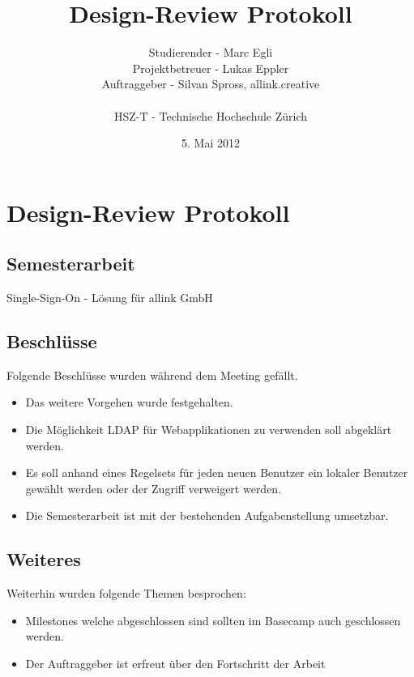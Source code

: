 \documentclass[]{scrreprt}
\title{Design-Review Protokoll}
\author{Studierender - Marc Egli\\
    Projektbetreuer - Lukas Eppler\\
    Auftraggeber - Silvan Spross, allink.creative\\
    \\
    HSZ-T - Technische Hochschule Zürich}
\date{5. Mai 2012}
\begin{document}
    \ifpdf
    \else
    \fi

    \maketitle



    \chapter{Design-Review Protokoll}

    \section{Semesterarbeit}
    Single-Sign-On - Lösung für allink GmbH

    \section{Beschlüsse}
    \label{sec:Beschlüsse}
    Folgende Beschlüsse wurden während dem Meeting gefällt.
    \begin{itemize}
        \item Das weitere Vorgehen wurde festgehalten.
        \item Die Möglichkeit LDAP für Webapplikationen zu verwenden soll abgeklärt werden.
        \item Es soll anhand eines Regelsets für jeden neuen Benutzer ein lokaler Benutzer gewählt werden oder der Zugriff verweigert werden.
        \item Die Semesterarbeit ist mit der bestehenden Aufgabenstellung umsetzbar.
    \end{itemize}
    
    \section{Weiteres}
    \label{sec:Weiteres}    
    Weiterhin wurden folgende Themen besprochen:
    \begin{itemize}
        \item Milestones welche abgeschlossen sind sollten im Basecamp auch geschlossen werden.
        \item Der Auftraggeber ist erfreut über den Fortschritt der Arbeit
    \end{itemize}
    
\end{document}
